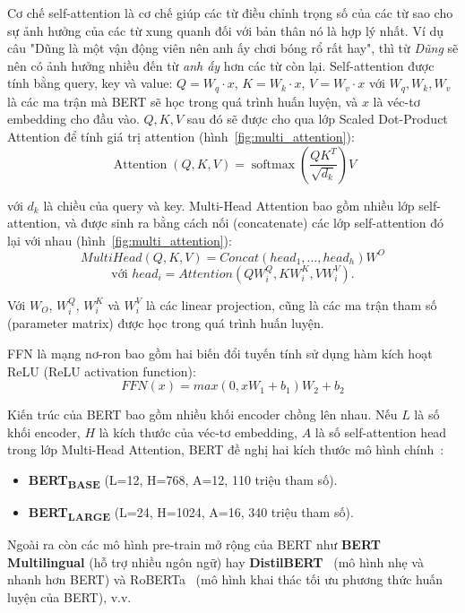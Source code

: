Cơ chế self-attention là cơ chế giúp các từ điều chỉnh trọng số của các từ sao
cho sự ảnh hưởng của các từ xung quanh đối với bản thân nó là hợp lý nhất. Ví
dụ câu "Dũng là một vận động viên nên anh ấy chơi bóng rổ rất hay", thì từ
\textit{Dũng} sẽ nên có ảnh hưởng nhiều đến từ \textit{anh ấy} hơn các từ còn
lại. Self-attention được tính bằng query, key và value: $Q = W_q \cdot x$, $K =
W_k \cdot x$, $V = W_v \cdot x$ với $W_q, W_k, W_v$ là các ma trận mà BERT sẽ
học trong quá trình huấn luyện, và $x$ là véc-tơ embedding cho đầu vào. $Q, K,
V$ sau đó sẽ được cho qua lớp Scaled Dot-Product Attention để tính giá trị
attention (hình~\ref{fig:multi_attention}):
\[ \operatorname{Attention}(Q, K, V)=\operatorname{softmax}\left(\frac{Q
K^{T}}{\sqrt{d_{k}}}\right) V \]

với $d_k$ là chiều của query và key. Multi-Head Attention bao gồm nhiều lớp
self-attention, và được sinh ra bằng cách nối (concatenate) các lớp
self-attention đó lại với nhau (hình~\ref{fig:multi_attention}):
\[ MultiHead(Q,K,V) = Concat(head_1,...,head_h)W^O \]
\[ \text{với } head_i = Attention(QW_i^Q, KW_i^K, VW_i^V). \]

Với $W_O$, $W_i^Q$, $W_i^K$ và $W_i^V$ là các linear projection, cũng là các ma
trận tham số (parameter matrix) được học trong quá trình huấn luyện.


FFN là mạng nơ-ron bao gồm hai biến đổi tuyến tính sử dụng hàm kích hoạt ReLU
(ReLU activation function):
\[ FFN(x) = max(0,xW_1 + b_1)W_2 + b_2 \]

Kiến trúc của BERT bao gồm nhiều khối encoder chồng lên nhau. Nếu $L$ là số
khối encoder, $H$ là kích thước của véc-tơ embedding, $A$ là số self-attention
head trong lớp Multi-Head Attention, BERT đề nghị hai kích thước mô hình
chính~\cite{devlinBERTPretrainingDeep2019}:
\begin{itemize}
	\item \textbf{BERT\textsubscript{BASE}} (L=12, H=768, A=12, 110 triệu tham
		số).
	\item \textbf{BERT\textsubscript{LARGE}} (L=24, H=1024, A=16, 340 triệu
		tham số).
\end{itemize}

Ngoài ra còn các mô hình pre-train mở rộng của BERT như \textbf{BERT
Multilingual} (hỗ trợ nhiều ngôn ngữ) hay
\textbf{DistilBERT}~\cite{sanhDistilBERTDistilledVersion2020} (mô hình nhẹ và
nhanh hơn BERT) và RoBERTa~\cite{liuRoBERTaRobustlyOptimized2019} (mô hình khai
thác tối ưu phương thức huấn luyện của BERT), v.v.

